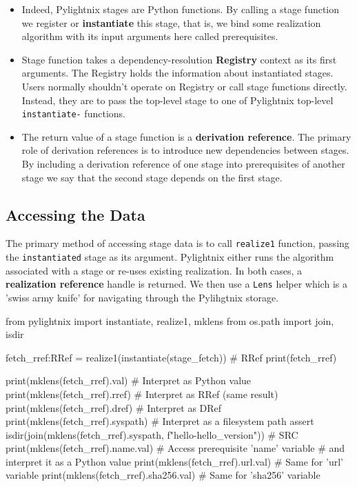 \begin{itemize}

  \item Indeed, Pylightnix stages are Python functions. By calling a stage
    function we register or \textbf{instantiate} this stage, that is, we bind
    some realization algorithm with its input arguments here called
    prerequisites.

  \item Stage function takes a dependency-resolution \textbf{Registry} context as
    its first arguments. The Registry holds the information about instantiated
    stages. Users normally shouldn't operate on Registry or call stage functions
    directly. Instead, they are to pass the top-level stage to one of Pylightnix
    top-level \texttt{instantiate-} functions.

  \item The return value of a stage function is a \textbf{derivation reference}.
    The primary role of derivation references is to introduce new dependencies
    between stages. By including a derivation reference of one stage into
    prerequisites of another stage we say that the second stage depends on the
    first stage.


\end{itemize}

\pagebreak
\subsection{Accessing the Data}

The primary method of accessing stage data is to call \texttt{realize1} function,
passing the \texttt{instantiated} stage as its argument. Pylightnix either runs
the algorithm associated with a stage or re-uses existing realization. In both
cases, a \textbf{realization reference} handle is returned. We then use a
\texttt{Lens} helper which is a 'swiss army knife' for navigating through the
Pylihgtnix storage.

\begin{pythontexcode}
from pylightnix import instantiate, realize1, mklens
from os.path import join, isdir

fetch_rref:RRef = realize1(instantiate(stage_fetch))  # RRef \label{RREF}
print(fetch_rref)

print(mklens(fetch_rref).val)      # Interpret as Python value
print(mklens(fetch_rref).rref)     # Interpret as RRef (same result)
print(mklens(fetch_rref).dref)     # Interpret as DRef
print(mklens(fetch_rref).syspath)  # Interpret as a filesystem path
assert isdir(join(mklens(fetch_rref).syspath,
             f"hello-{hello_version}"))  # SRC \label{SRC}
print(mklens(fetch_rref).name.val) # Access prerequisite 'name' variable
                                   # and interpret it as a Python value
print(mklens(fetch_rref).url.val)  # Same for 'url' variable
print(mklens(fetch_rref).sha256.val)  # Same for 'sha256' variable
\end{pythontexcode}

